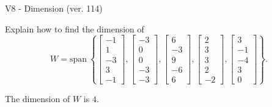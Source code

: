 \begin{exercise}
  \begin{exerciseTitle}V8 - Dimension (ver. 114)\end{exerciseTitle}
  \begin{exerciseStatement}
    Explain how to find the dimension of 
\[W=\mathrm{span}\ \left\{\left[\begin{array}{r}
-1 \\
1 \\
-3 \\
3 \\
-1
\end{array}\right] , \left[\begin{array}{r}
-3 \\
0 \\
0 \\
-3 \\
-3
\end{array}\right] , \left[\begin{array}{r}
6 \\
-3 \\
9 \\
-6 \\
6
\end{array}\right] , \left[\begin{array}{r}
2 \\
3 \\
3 \\
2 \\
-2
\end{array}\right] , \left[\begin{array}{r}
3 \\
-1 \\
-4 \\
3 \\
0
\end{array}\right]\right\}.\]



  \end{exerciseStatement}
  \begin{exerciseAnswer}
   The dimension of \(W\) is  \(4\).
  


  \end{exerciseAnswer}
\end{exercise}